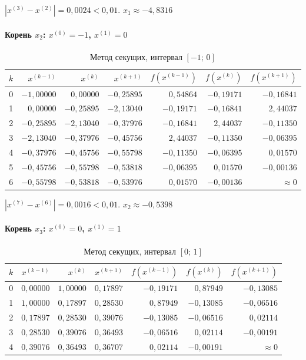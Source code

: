 \documentclass[a4paper,12pt]{article}
\begin{document}
$|x^{(3)} - x^{(2)}| = 0{,}0024 < 0{,}01$. \quad $\boxed{x_1 \approx -4{,}8316}$

\paragraph{Корень $x_2$: $x^{(0)} = -1$, $x^{(1)} = 0$}

\begin{table}[H]
\centering
\caption{Метод секущих, интервал $[-1;\,0]$}
\begin{tabular}{crrrrrr}
\toprule
$k$ & $x^{(k-1)}$ & $x^{(k)}$ & $x^{(k+1)}$ & $f(x^{(k-1)})$ & $f(x^{(k)})$ & $f(x^{(k+1)})$ \\
\midrule
0 & $-1{,}00000$ & $0{,}00000$  & $-0{,}25895$ & $0{,}54864$  & $-0{,}19171$ & $-0{,}16841$ \\
1 & $0{,}00000$  & $-0{,}25895$ & $-2{,}13040$ & $-0{,}19171$ & $-0{,}16841$ & $2{,}44037$  \\
2 & $-0{,}25895$ & $-2{,}13040$ & $-0{,}37976$ & $-0{,}16841$ & $2{,}44037$  & $-0{,}11350$ \\
3 & $-2{,}13040$ & $-0{,}37976$ & $-0{,}45756$ & $2{,}44037$  & $-0{,}11350$ & $-0{,}06395$ \\
4 & $-0{,}37976$ & $-0{,}45756$ & $-0{,}55798$ & $-0{,}11350$ & $-0{,}06395$ & $0{,}01570$  \\
5 & $-0{,}45756$ & $-0{,}55798$ & $-0{,}53818$ & $-0{,}06395$ & $0{,}01570$  & $-0{,}00136$ \\
6 & $-0{,}55798$ & $-0{,}53818$ & $-0{,}53976$ & $0{,}01570$  & $-0{,}00136$ & $\approx 0$  \\
\bottomrule
\end{tabular}
\end{table}

$|x^{(7)} - x^{(6)}| = 0{,}0016 < 0{,}01$. \quad $\boxed{x_2 \approx -0{,}5398}$

\paragraph{Корень $x_3$: $x^{(0)} = 0$, $x^{(1)} = 1$}

\begin{table}[H]
\centering
\caption{Метод секущих, интервал $[0;\,1]$}
\begin{tabular}{crrrrrr}
\toprule
$k$ & $x^{(k-1)}$ & $x^{(k)}$ & $x^{(k+1)}$ & $f(x^{(k-1)})$ & $f(x^{(k)})$ & $f(x^{(k+1)})$ \\
\midrule
0 & $0{,}00000$ & $1{,}00000$ & $0{,}17897$ & $-0{,}19171$ & $0{,}87949$  & $-0{,}13085$ \\
1 & $1{,}00000$ & $0{,}17897$ & $0{,}28530$ & $0{,}87949$  & $-0{,}13085$ & $-0{,}06516$ \\
2 & $0{,}17897$ & $0{,}28530$ & $0{,}39076$ & $-0{,}13085$ & $-0{,}06516$ & $0{,}02114$  \\
3 & $0{,}28530$ & $0{,}39076$ & $0{,}36493$ & $-0{,}06516$ & $0{,}02114$  & $-0{,}00191$ \\
4 & $0{,}39076$ & $0{,}36493$ & $0{,}36707$ & $0{,}02114$  & $-0{,}00191$ & $\approx 0$  \\
\bottomrule
\end{tabular}
\end{table}
\end{document}
